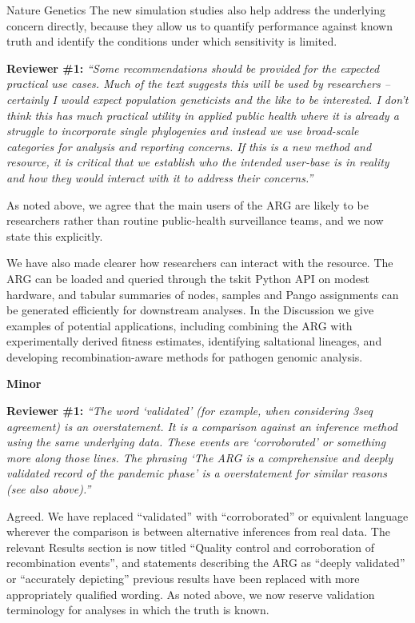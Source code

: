 \documentclass{letter}
\begin{document}
\begin{letter}{Nature Genetics}
The new simulation studies also help address the underlying concern directly,
because they allow us to quantify performance against known truth and identify
the conditions under which sensitivity is limited.

\noindent \textbf{Reviewer \#1:} \textit{``Some recommendations should be provided for
the expected practical use cases. Much of the text suggests this will be used
by researchers -- certainly I would expect population geneticists and the like
to be interested. I don't think this has much practical utility in applied
public health where it is already a struggle to incorporate single phylogenies
and instead we use broad-scale categories for analysis and reporting concerns.
If this is a new method and resource, it is critical that we establish who the
intended user-base is in reality and how they would interact with it to
address their concerns.''}

As noted above, we agree that the main users of the ARG are likely to be
researchers rather than routine public-health surveillance teams, and we now
state this explicitly.

We have also made clearer how researchers can interact with the resource. The
ARG can be loaded and queried through the tskit Python API on modest hardware,
and tabular summaries of nodes, samples and Pango assignments can be generated
efficiently for downstream analyses. In the Discussion we give examples of
potential applications, including combining the ARG with experimentally derived
fitness estimates, identifying saltational lineages, and developing
recombination-aware methods for pathogen genomic analysis.

\medskip
\noindent \textbf{Minor}

\noindent \textbf{Reviewer \#1:} \textit{``The word `validated' (for example, when
considering 3seq agreement) is an overstatement. It is a comparison against an
inference method using the same underlying data. These events are
`corroborated' or something more along those lines. The phrasing `The ARG is a
comprehensive and deeply validated record of the pandemic phase' is a
overstatement for similar reasons (see also above).''}

Agreed. We have replaced ``validated'' with ``corroborated'' or equivalent language
wherever the comparison is between alternative inferences from real data. The
relevant Results section is now titled ``Quality control and corroboration of
recombination events'', and statements describing the ARG as ``deeply
validated''
or ``accurately depicting'' previous results have been replaced with more
appropriately qualified wording. As noted above, we now reserve validation
terminology for analyses in which the truth is known.



\end{letter}
\end{document}
